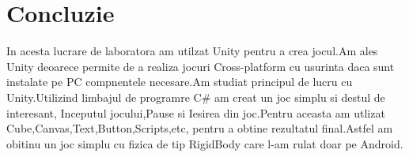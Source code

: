 \section*{Concluzie}
In acesta lucrare de laboratora am utilzat Unity pentru a crea jocul.Am ales Unity deoarece permite de a realiza jocuri Cross-platform cu usurinta daca sunt instalate pe PC compnentele necesare.Am studiat principul de lucru cu Unity.Utilizind limbajul de programre C\# am creat un joc simplu si destul de interesant, Inceputul jocului,Pause si Iesirea din joc.Pentru aceasta am utlizat Cube,Canvas,Text,Button,Scripts,etc, pentru a obtine rezultatul final.Astfel am obitinu un joc simplu cu fizica de tip RigidBody care l-am rulat doar pe Android.

\clearpage